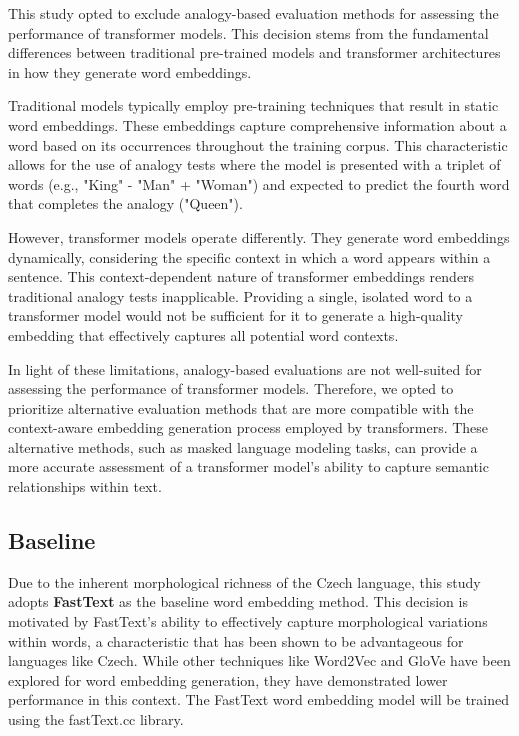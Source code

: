 This study opted to exclude analogy-based evaluation methods for assessing the performance of transformer models.
This decision stems from the fundamental differences between traditional pre-trained models and transformer architectures in how they generate word embeddings.

Traditional models typically employ pre-training techniques that result in static word embeddings.
These embeddings capture comprehensive information about a word based on its occurrences throughout the training corpus.
This characteristic allows for the use of analogy tests where the model is presented with a triplet of words (e.g., "King" - "Man" + "Woman") and expected to predict the fourth word that completes the analogy ("Queen").

However, transformer models operate differently.
They generate word embeddings dynamically, considering the specific context in which a word appears within a sentence.
This context-dependent nature of transformer embeddings renders traditional analogy tests inapplicable.
Providing a single, isolated word to a transformer model would not be sufficient for it to generate a high-quality embedding that effectively captures all potential word contexts.

In light of these limitations, analogy-based evaluations are not well-suited for assessing the performance of transformer models.
Therefore, we opted to prioritize alternative evaluation methods that are more compatible with the context-aware embedding generation process employed by transformers.
These alternative methods, such as masked language modeling tasks, can provide a more accurate assessment of a transformer model's ability to capture semantic relationships within text.

\subsection{Baseline}
Due to the inherent morphological richness of the Czech language, this study adopts \textbf{FastText} as the baseline word embedding method.
This decision is motivated by FastText's ability to effectively capture morphological variations within words, a characteristic that has been shown to be advantageous for languages like Czech.
While other techniques like Word2Vec and \ac{GloVe} have been explored for word embedding generation, they have demonstrated lower performance in this context.
The FastText word embedding model will be trained using the fastText.cc library.

